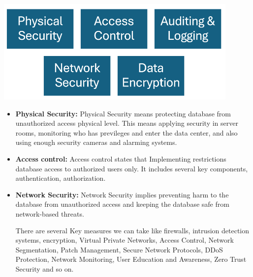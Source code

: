 \documentclass[12pt]{book} %
\begin{document}
\includegraphics[width=450px]{assets/types_of_db_security.png}\\[1cm] %





\begin{itemize}
		\item \textbf{Physical Security:} Physical Security means protecting database from unauthorized access physical level. This means applying security in server rooms, monitoring who has previleges and enter the data center, and also using enough security cameras and alarming systems.
		
		
		\item \textbf{Access control:} Access control states that Implementing restrictions database access to authorized users only. It includes several key components, authentication, authorization.

        \item \textbf{Network Security:} Network Security implies preventing harm to the database from unauthorized access and keeping the database safe from network-based threats. 
        
        There are several Key measures we can take like firewalls, intrusion detection systems, encryption, Virtual Private Networks, Access Control, Network Segmentation, Patch Management, Secure Network Protocols, DDoS Protection, Network Monitoring, User Education and Awareness, Zero Trust Security and so on.
\end{itemize}
\end{document}
